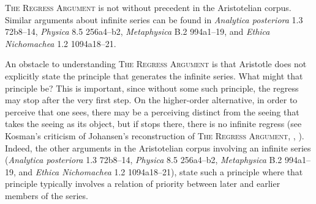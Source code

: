\textsc{The Regress Argument} is not without precedent in the Aristotelian corpus. Similar arguments about infinite series can be found in \emph{Analytica posteriora} 1.3 72b8–14, \emph{Physica} 8.5 256a4–b2, \emph{Metaphysica} B.2 994a1–19, and \emph{Ethica Nichomachea} 1.2 1094a18–21.

An obstacle to understanding \textsc{The Regress Argument} is that Aristotle does not explicitly state the principle that generates the infinite series. What might that principle be? This is important, since without some such principle, the regress may stop after the very first step. On the higher-order alternative, in order to perceive that one sees, there may be a perceiving distinct from the seeing that takes the seeing as its object, but if stops there, there is no infinite regress (see Kosman's \citeyear[280–1]{Kosman:2005ff} criticism of Johansen's \citeyear{Johansen:2005hz} reconstruction of \textsc{The Regress Argument}, \citealt[206]{Sorabji:2006aa}, \citealt[202]{Corkum:2010fa}). Indeed, the other arguments in the Aristotelian corpus involving an infinite series (\emph{Analytica posteriora} 1.3 72b8–14, \emph{Physica} 8.5 256a4–b2, \emph{Metaphysica} B.2 994a1–19, and \emph{Ethica Nichomachea} 1.2 1094a18–21), state such a principle where that principle typically involves a relation of priority between later and earlier members of the series.

